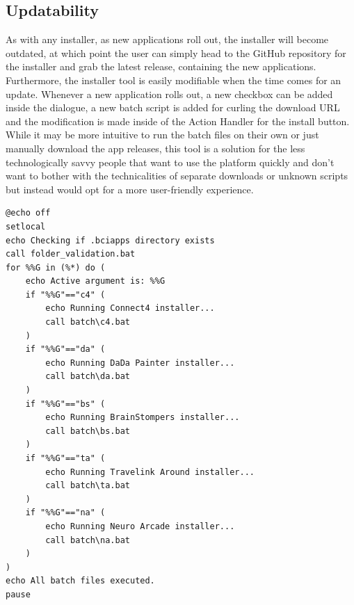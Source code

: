 \subsection{Updatability}
As with any installer, as new applications roll out, the installer will become outdated, at which point the user can simply head to the GitHub repository for the installer and grab the latest release, containing the new applications. Furthermore, the installer tool is easily modifiable when the time comes for an update. Whenever a new application rolls out, a new checkbox can be added inside the dialogue, a new batch script is added for curling the download URL and the modification is made inside of the Action Handler for the install button. While it may be more intuitive to run the batch files on their own or just manually download the app releases, this tool is a solution for the less technologically savvy people that want to use the platform quickly and don't want to bother with the technicalities of separate downloads or unknown scripts but instead would opt for a more user-friendly experience.

\begin{lstlisting}[language={[Sharp]C}, caption={Action Handler for the Install Apps button}, label={Script}]
@echo off
setlocal
echo Checking if .bciapps directory exists
call folder_validation.bat
for %%G in (%*) do (
    echo Active argument is: %%G
    if "%%G"=="c4" (
        echo Running Connect4 installer...
        call batch\c4.bat
    )
    if "%%G"=="da" (
        echo Running DaDa Painter installer...
        call batch\da.bat
    )
    if "%%G"=="bs" (
        echo Running BrainStompers installer...
        call batch\bs.bat
    )
    if "%%G"=="ta" (
        echo Running Travelink Around installer...
        call batch\ta.bat
    )
    if "%%G"=="na" (
        echo Running Neuro Arcade installer...
        call batch\na.bat
    )
)
echo All batch files executed.
pause
\end{lstlisting}




